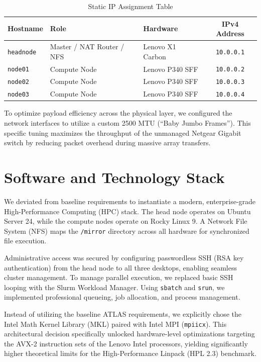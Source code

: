 \documentclass[11pt]{article}
\begin{document}
\begin{table}[H]
  \centering
  \caption{Static IP Assignment Table}
  \label{tab:ip_table}
  \begin{tabular}{lllc}
    \toprule
    \textbf{Hostname} & \textbf{Role} & \textbf{Hardware} & \textbf{IPv4 Address} \\
    \midrule
    \texttt{headnode} & Master / NAT Router / NFS & Lenovo X1 Carbon & \texttt{10.0.0.1} \\
    \texttt{node01}   & Compute Node              & Lenovo P340 SFF & \texttt{10.0.0.2} \\
    \texttt{node02}   & Compute Node              & Lenovo P340 SFF & \texttt{10.0.0.3} \\
    \texttt{node03}   & Compute Node              & Lenovo P340 SFF & \texttt{10.0.0.4} \\
    \bottomrule
  \end{tabular}
\end{table}

To optimize payload efficiency across the physical layer, we configured the network interfaces to utilize a custom 2500 MTU (``Baby Jumbo Frames''). This specific tuning maximizes the throughput of the unmanaged Netgear Gigabit switch by reducing packet overhead during massive array transfers.

\section{Software and Technology Stack}
We deviated from baseline requirements to instantiate a modern, enterprise-grade High-Performance Computing (HPC) stack. The head node operates on Ubuntu Server 24, while the compute nodes operate on Rocky Linux 9. A Network File System (NFS) maps the \texttt{/mirror} directory across all hardware for synchronized file execution.

Administrative access was secured by configuring passwordless SSH (RSA key authentication) from the head node to all three desktops, enabling seamless cluster management. To manage parallel execution, we replaced basic SSH looping with the Slurm Workload Manager. Using \texttt{sbatch} and \texttt{srun}, we implemented professional queueing, job allocation, and process management.

Instead of utilizing the baseline ATLAS requirements, we explicitly chose the Intel Math Kernel Library (MKL) paired with Intel MPI (\texttt{mpiicx}). This architectural decision specifically unlocked hardware-level optimizations targeting the AVX-2 instruction sets of the Lenovo Intel processors, yielding significantly higher theoretical limits for the High-Performance Linpack (HPL 2.3) benchmark.
\end{document}

